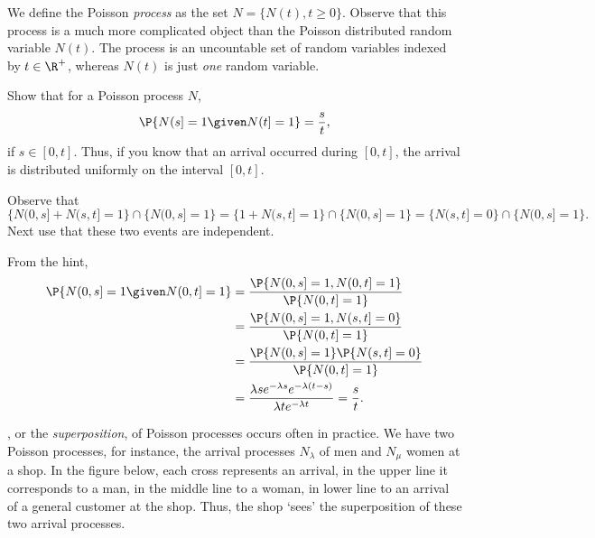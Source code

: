 We define the Poisson \emph{process} as the set $N=\{N(t), t\geq 0\}$. Observe that this process is a much more complicated object than the Poisson distributed random variable $N(t)$. The
process is an uncountable set of random variables indexed by  $t\in \R^+$, whereas $N(t)$ is just \emph{one} random variable.

\begin{exercise}
Show that  for a Poisson process $N$, 
\begin{equation*}
\P{N(s] =1\given N(t]=1} = \frac s t,
\end{equation*}
if $s\in[0,t]$. Thus, if you know that an arrival occurred during $[0,t]$, the arrival is distributed
uniformly on the interval $[0,t]$.
\begin{hint}
 Observe that 
  \begin{equation*}
\{N(0,s]+N(s,t]=1\}\cap\{N(0,s]=1\} = \{1+N(s,t]=1\}\cap\{N(0,s]=1\}=\{N(s,t]=0\}\cap\{N(0,s]=1\}.
  \end{equation*}
Next use that these two events are independent.
\end{hint}
\begin{solution}
From the hint,
\begin{align*}
  \P{N(0,s] =1\given N(0,t]=1} 
&= \frac{\P{N(0,s] =1, N(0,t]=1}}{\P{N(0,t]=1}} \\
&= \frac{\P{N(0,s] =1, N(s,t]=0}}{\P{N(0,t]=1}} \\
&= \frac{\P{N(0,s] =1}\P{N(s,t]=0}}{\P{N(0,t]=1}} \\
&= \frac{\lambda s e^{-\lambda s} e^{-\lambda (t-s)}}{\lambda t e^{-\lambda t}} = \frac s t.
\end{align*}
\end{solution}
\end{exercise}

 


, or the \emph{superposition}, of Poisson processes
occurs often in practice.  We have two Poisson processes, for
instance, the arrival processes $N_\lambda$ of men and $N_\mu$ women
at a shop. In the figure below, each cross represents an arrival, in
the upper line it corresponds to a man, in the middle line to a woman, in
lower line to an arrival of a general customer at the shop. Thus, the
shop `sees' the superposition of these two arrival
processes.




